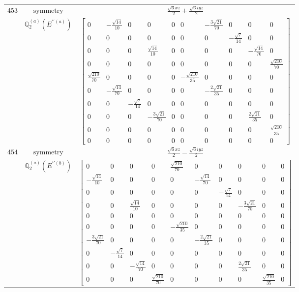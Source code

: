 \documentclass[fleqn,8pt,landscape]{jsarticle}
\begin{document}
\begin{longtable}{ccc}
$ 453 $ & $ \text{symmetry} $ & $ \frac{\sqrt{6} x z}{2} + \frac{\sqrt{6} i y z}{2} $ \\
$  $ & $ \mathbb{Q}_{2}^{(a)}(E^{\prime\prime(a)}) $ & $ \begin{bmatrix} 0 & - \frac{\sqrt{14}}{10} & 0 & 0 & 0 & 0 & - \frac{3 \sqrt{21}}{70} & 0 & 0 & 0 \\ 0 & 0 & 0 & 0 & 0 & 0 & 0 & - \frac{\sqrt{7}}{14} & 0 & 0 \\ 0 & 0 & 0 & \frac{\sqrt{14}}{10} & 0 & 0 & 0 & 0 & - \frac{\sqrt{14}}{70} & 0 \\ 0 & 0 & 0 & 0 & 0 & 0 & 0 & 0 & 0 & \frac{\sqrt{210}}{70} \\ \frac{\sqrt{210}}{70} & 0 & 0 & 0 & 0 & - \frac{\sqrt{210}}{35} & 0 & 0 & 0 & 0 \\ 0 & - \frac{\sqrt{14}}{70} & 0 & 0 & 0 & 0 & - \frac{2 \sqrt{21}}{35} & 0 & 0 & 0 \\ 0 & 0 & - \frac{\sqrt{7}}{14} & 0 & 0 & 0 & 0 & 0 & 0 & 0 \\ 0 & 0 & 0 & - \frac{3 \sqrt{21}}{70} & 0 & 0 & 0 & 0 & \frac{2 \sqrt{21}}{35} & 0 \\ 0 & 0 & 0 & 0 & 0 & 0 & 0 & 0 & 0 & \frac{\sqrt{210}}{35} \\ 0 & 0 & 0 & 0 & 0 & 0 & 0 & 0 & 0 & 0 \end{bmatrix} $ \\ \hline
$ 454 $ & $ \text{symmetry} $ & $ \frac{\sqrt{6} x z}{2} - \frac{\sqrt{6} i y z}{2} $ \\
$  $ & $ \mathbb{Q}_{2}^{(a)}(E^{\prime\prime(b)}) $ & $ \begin{bmatrix} 0 & 0 & 0 & 0 & \frac{\sqrt{210}}{70} & 0 & 0 & 0 & 0 & 0 \\ - \frac{\sqrt{14}}{10} & 0 & 0 & 0 & 0 & - \frac{\sqrt{14}}{70} & 0 & 0 & 0 & 0 \\ 0 & 0 & 0 & 0 & 0 & 0 & - \frac{\sqrt{7}}{14} & 0 & 0 & 0 \\ 0 & 0 & \frac{\sqrt{14}}{10} & 0 & 0 & 0 & 0 & - \frac{3 \sqrt{21}}{70} & 0 & 0 \\ 0 & 0 & 0 & 0 & 0 & 0 & 0 & 0 & 0 & 0 \\ 0 & 0 & 0 & 0 & - \frac{\sqrt{210}}{35} & 0 & 0 & 0 & 0 & 0 \\ - \frac{3 \sqrt{21}}{70} & 0 & 0 & 0 & 0 & - \frac{2 \sqrt{21}}{35} & 0 & 0 & 0 & 0 \\ 0 & - \frac{\sqrt{7}}{14} & 0 & 0 & 0 & 0 & 0 & 0 & 0 & 0 \\ 0 & 0 & - \frac{\sqrt{14}}{70} & 0 & 0 & 0 & 0 & \frac{2 \sqrt{21}}{35} & 0 & 0 \\ 0 & 0 & 0 & \frac{\sqrt{210}}{70} & 0 & 0 & 0 & 0 & \frac{\sqrt{210}}{35} & 0 \end{bmatrix} $ \\ \hline

\end{longtable}
\end{document}
